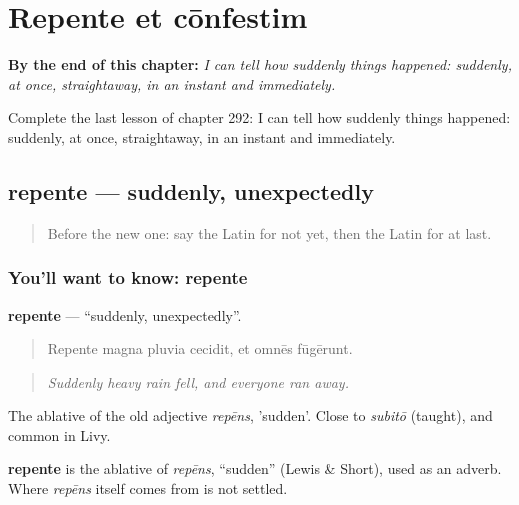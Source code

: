 
\chapter{Repente et cōnfestim}
\label{ch:la-repente-et-confestim}

\begin{chapteropening}
\textbf{By the end of this chapter:} \emph{I can tell how suddenly things happened: suddenly, at once, straightaway, in an instant and immediately.}

Complete the last lesson of chapter 292: I can tell how suddenly things happened: suddenly, at once, straightaway, in an instant and immediately.
\end{chapteropening}

\section[repente]{repente — suddenly, unexpectedly}

\label{lesson:LA-C292-repente}



\begin{quote}
Before the new one: say the Latin for not yet, then the Latin for at last.
\end{quote}

\subsection*{You'll want to know: repente}
\textbf{repente} — \textquotedblleft{}suddenly, unexpectedly\textquotedblright{}.

\begin{quote}
Repente magna pluvia cecidit, et omnēs fūgērunt.
\end{quote}

\begin{quote}
\emph{Suddenly heavy rain fell, and everyone ran away.}
\end{quote}

The ablative of the old adjective \emph{repēns}, 'sudden'. Close to \emph{subitō} (taught), and common in Livy.

\begin{cousinweb}
\textbf{repente} is the ablative of \emph{repēns}, \textquotedblleft{}sudden\textquotedblright{} (Lewis \& Short), used as an adverb. Where \emph{repēns} itself comes from is not settled.
\end{cousinweb}

